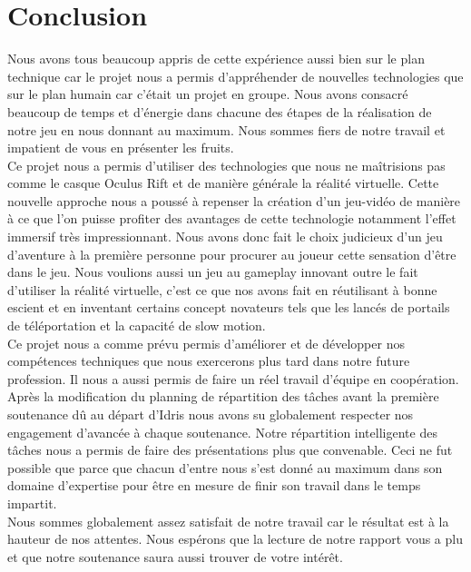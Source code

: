 \documentclass[12pt]{article}
\begin{document}
\newpage

\section*{Conclusion}

Nous avons tous beaucoup appris de cette expérience aussi bien sur le plan technique car le projet nous a permis d'appréhender de nouvelles technologies que sur le plan humain car c'était un projet en groupe. Nous avons consacré beaucoup de temps et d'énergie dans chacune des étapes de la réalisation de notre jeu en nous donnant au maximum. Nous sommes fiers de notre travail et impatient de vous en présenter les fruits.\\
Ce projet nous a permis d'utiliser des technologies que nous ne maîtrisions pas comme le casque Oculus Rift et de manière générale la réalité virtuelle. Cette nouvelle approche nous a poussé à repenser la création d'un jeu-vidéo de manière à ce que l'on puisse profiter des avantages de cette technologie notamment l'effet immersif très impressionnant. Nous avons donc fait le choix judicieux d'un jeu d'aventure à la première personne pour procurer au joueur cette sensation d'être dans le jeu. Nous voulions aussi un jeu au gameplay innovant outre le fait d'utiliser la réalité virtuelle, c'est ce que nos avons fait en réutilisant à bonne escient et en inventant certains concept novateurs tels que les lancés de portails de téléportation et la capacité de slow motion.\\
Ce projet nous a comme prévu permis d'améliorer et de développer nos compétences techniques que nous exercerons plus tard dans notre future profession. Il nous a aussi permis de faire un réel travail d'équipe en coopération.\\
Après la modification du planning de répartition des tâches avant la première soutenance dû au départ d'Idris nous avons su globalement respecter nos engagement d'avancée à chaque soutenance. Notre répartition intelligente des tâches nous a permis de faire des présentations plus que convenable. Ceci ne fut possible que parce que chacun d'entre nous s'est donné au maximum dans son domaine d'expertise pour être en mesure de finir son travail dans le temps impartit.\\
Nous sommes globalement assez satisfait de notre travail car le résultat est à la hauteur de nos attentes. Nous espérons que la lecture de notre rapport vous a plu et que notre soutenance saura aussi trouver de votre intérêt.


\newpage

\printglossaries
\end{document}
